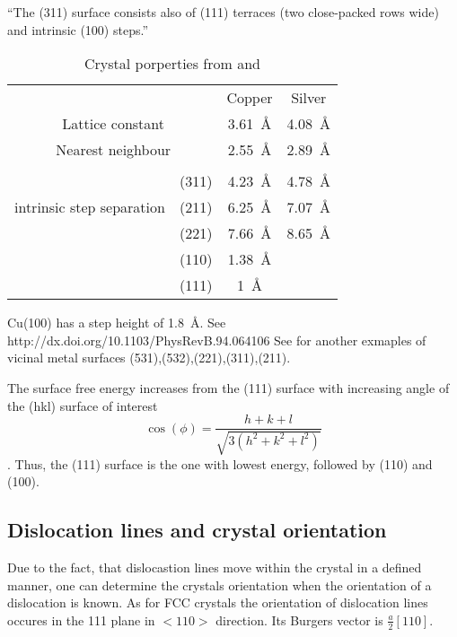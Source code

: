 ``The (311) surface consists also of (111) terraces (two close-packed rows wide) and intrinsic (100) steps.''

\begin{table}\label{tab:crystal-prop}
\caption{Crystal porperties from \cite[29ff]{riemann_ionic_2002} and \cite{liu_oxygen_2014}}
\centering
\begin{tabular}{cccc}
			&				& Copper 	 & Silver \\
\multicolumn{2}{c}{Lattice constant}			& \SI{3.61}{\angstrom} & \SI{4.08}{\angstrom} \\
\multicolumn{2}{c}{Nearest neighbour}			& \SI{2.55}{\angstrom} & \SI{2.89}{\angstrom} \\ \hline \\
\multirow{3}{*}{intrinsic step separation}	& (311) & \SI{4.23}{\angstrom} & \SI{4.78}{\angstrom} \\
						& (211) & \SI{6.25}{\angstrom} & \SI{7.07}{\angstrom} \\
						& (221) & \SI{7.66}{\angstrom} & \SI{8.65}{\angstrom} \\
						& (110) & \SI{1.38}{\angstrom} & \\
						& (111) & \SI{1}{\angstrom} & \\
\end{tabular}
\end{table}
Cu(100) has a step height of \SI{1.8}{\angstrom}. See http://dx.doi.org/10.1103/PhysRevB.94.064106
See \cite{riemann_ionic_2002} for another exmaples of vicinal metal surfaces (531),(532),(221),(311),(211).

The surface free energy increases from the (111) surface with increasing angle of the (hkl) surface of interest $$\cos(\phi)=\frac{h+k+l}{\sqrt{3(h^2+k^2+l^2)}}$$ \cite{jian-min_calculation_2004}. Thus, the (111) surface is the one with lowest energy, followed by (110) and (100).

\subsection{Dislocation lines and crystal orientation}
Due to the fact, that dislocastion lines move within the crystal in a defined manner, one can determine the crystals orientation when the orientation of a dislocation is known.
As for FCC crystals the orientation of dislocation lines occures in the {111} plane in $<110>$ direction. Its Burgers vector is $\frac{a}{2}[110]$\cite{_dislocation-theory}.